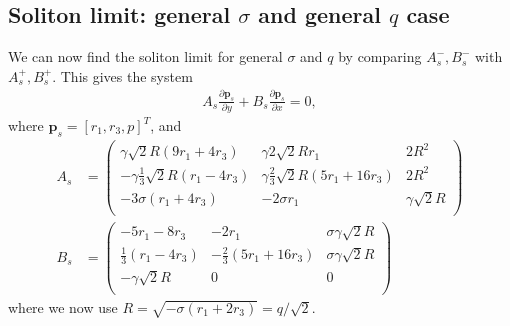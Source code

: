 \documentclass[12pt]{article}
\numberwithin{equation}{section}
\begin{document}
\subsection{Soliton limit: general $\sigma$ and general $q$ case}
We can now find the soliton limit for general $\sigma$ and $q$ by comparing $A_s^-,B_s^-$ with $A_s^+,B_s^+$. This gives the system
\begin{align}
    A_{s}\frac{\partial \textbf{p}_{s}}{\partial y} + B_{s}\frac{\partial \textbf{p}_{s}}{\partial x} =0, \label{vector eq for statKPWS}
\end{align}
where $\textbf{p}_{s} = [r_1,r_3,p]^T$, and 
\begin{subequations}
    \begin{align}
          A_s &= \left(
\begin{array}{ccc}
 \gamma\sqrt{2} R (9 r_1+4 r_3) & \gamma2 \sqrt{2} R r_1 & 2 R^2 \\
 -\gamma\frac{1}{3} \sqrt{2} R (r_1-4 r_3) & \gamma\frac{2}{3} \sqrt{2} R (5 r_1+16 r_3) & 2R^2 \\
 -3\sigma( r_1+4 r_3 )& -2\sigma r_1 & \gamma\sqrt{2} R \\
\end{array}
\right) \\
B_s &= \left(
\begin{array}{ccc}
 -5 r_1-8 r_3 & -2 r_1 & \sigma\gamma\sqrt{2} R \\
 \frac{1}{3} (r_1-4 r_3) & -\frac{2}{3} (5 r_1+16 r_3) & \sigma\gamma\sqrt{2} R \\
 -\gamma\sqrt{2} R & 0 & 0 \\
\end{array}
\right)
    \end{align}
\end{subequations}
where we now use $R = \sqrt{-\sigma(r_1+2r_3)} = q/\sqrt{2}$. 

\end{document}

